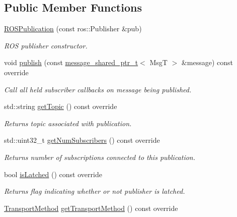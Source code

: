 \subsection*{Public Member Functions}
\begin{DoxyCompactItemize}
\item 
\hyperlink{classflow__ros_1_1routing_1_1_r_o_s_publication_a78988f8588dc65e7e6b97dcb89b3f32a}{R\+O\+S\+Publication} (const ros\+::\+Publisher \&pub)
\begin{DoxyCompactList}\small\item\em R\+OS publisher constructor. \end{DoxyCompactList}\item 
void \hyperlink{classflow__ros_1_1routing_1_1_r_o_s_publication_a1ad3cf68c465a909399bb4496e561f0b}{publish} (const \hyperlink{namespaceflow__ros_a21a684f38ee2083b3858613317c46d82}{message\+\_\+shared\+\_\+ptr\+\_\+t}$<$ MsgT $>$ \&message) const override
\begin{DoxyCompactList}\small\item\em Call all held subscriber callbacks on message being published. \end{DoxyCompactList}\item 
std\+::string \hyperlink{classflow__ros_1_1routing_1_1_r_o_s_publication_a283e0832b79e8b1167d5e46bcde49c0b}{get\+Topic} () const override
\begin{DoxyCompactList}\small\item\em Returns topic associated with publication. \end{DoxyCompactList}\item 
std\+::uint32\+\_\+t \hyperlink{classflow__ros_1_1routing_1_1_r_o_s_publication_a2f7dac08ffdaab4942dde41f6e5b39ba}{get\+Num\+Subscribers} () const override
\begin{DoxyCompactList}\small\item\em Returns number of subscriptions connected to this publication. \end{DoxyCompactList}\item 
bool \hyperlink{classflow__ros_1_1routing_1_1_r_o_s_publication_a1abd966d244c71911a75a20a089025bc}{is\+Latched} () const override
\begin{DoxyCompactList}\small\item\em Returns flag indicating whether or not publisher is latched. \end{DoxyCompactList}\item 
\hyperlink{transport__info_8h_ae57afcf849a5bdb82b958347c6ccc57b}{Transport\+Method} \hyperlink{classflow__ros_1_1routing_1_1_r_o_s_publication_a2f2f880c127e4115d7edb85fb7faa067}{get\+Transport\+Method} () const override

\end{DoxyCompactItemize}
